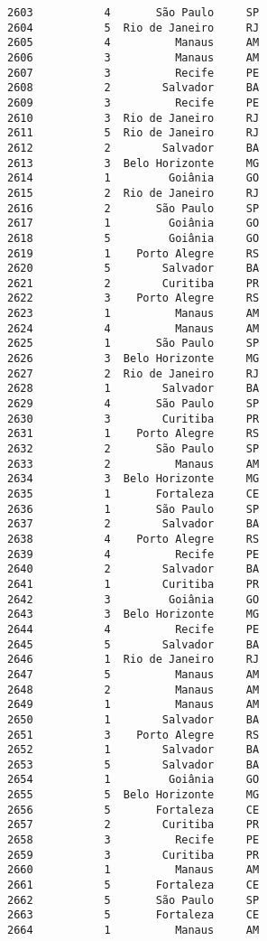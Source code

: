 \documentclass[11pt]{article}
\begin{document}
\begin{Verbatim}[commandchars=\\\{\}]
2603           4       São Paulo     SP  
2604           5  Rio de Janeiro     RJ  
2605           4          Manaus     AM  
2606           3          Manaus     AM  
2607           3          Recife     PE  
2608           2        Salvador     BA  
2609           3          Recife     PE  
2610           3  Rio de Janeiro     RJ  
2611           5  Rio de Janeiro     RJ  
2612           2        Salvador     BA  
2613           3  Belo Horizonte     MG  
2614           1         Goiânia     GO  
2615           2  Rio de Janeiro     RJ  
2616           2       São Paulo     SP  
2617           1         Goiânia     GO  
2618           5         Goiânia     GO  
2619           1    Porto Alegre     RS  
2620           5        Salvador     BA  
2621           2        Curitiba     PR  
2622           3    Porto Alegre     RS  
2623           1          Manaus     AM  
2624           4          Manaus     AM  
2625           1       São Paulo     SP  
2626           3  Belo Horizonte     MG  
2627           2  Rio de Janeiro     RJ  
2628           1        Salvador     BA  
2629           4       São Paulo     SP  
2630           3        Curitiba     PR  
2631           1    Porto Alegre     RS  
2632           2       São Paulo     SP  
2633           2          Manaus     AM  
2634           3  Belo Horizonte     MG  
2635           1       Fortaleza     CE  
2636           1       São Paulo     SP  
2637           2        Salvador     BA  
2638           4    Porto Alegre     RS  
2639           4          Recife     PE  
2640           2        Salvador     BA  
2641           1        Curitiba     PR  
2642           3         Goiânia     GO  
2643           3  Belo Horizonte     MG  
2644           4          Recife     PE  
2645           5        Salvador     BA  
2646           1  Rio de Janeiro     RJ  
2647           5          Manaus     AM  
2648           2          Manaus     AM  
2649           1          Manaus     AM  
2650           1        Salvador     BA  
2651           3    Porto Alegre     RS  
2652           1        Salvador     BA  
2653           5        Salvador     BA  
2654           1         Goiânia     GO  
2655           5  Belo Horizonte     MG  
2656           5       Fortaleza     CE  
2657           2        Curitiba     PR  
2658           3          Recife     PE  
2659           3        Curitiba     PR  
2660           1          Manaus     AM  
2661           5       Fortaleza     CE  
2662           5       São Paulo     SP  
2663           5       Fortaleza     CE  
2664           1          Manaus     AM  

\end{Verbatim}
\end{document}
